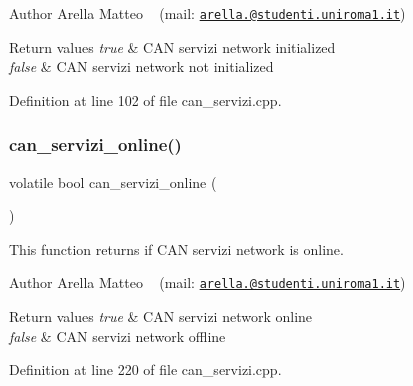 \begin{DoxyAuthor}{Author}
Arella Matteo ~\newline
 (mail\+: \href{mailto:arella.1646983@studenti.uniroma1.it}{\tt arella.@studenti.\+uniroma1.\+it})
\end{DoxyAuthor}

\begin{DoxyRetVals}{Return values}
{\em true} & C\+AN servizi network initialized \\
\hline
{\em false} & C\+AN servizi network not initialized \\
\hline
\end{DoxyRetVals}


Definition at line 102 of file can\+\_\+servizi.\+cpp.

\mbox{\label{group___c_a_n__servizi__group_ga43e9ef52770f760c5751d83b138c7e6b}} 
\subsubsection{\texorpdfstring{can\+\_\+servizi\+\_\+online()}{can\_servizi\_online()}}
{\footnotesize\ttfamily volatile bool can\+\_\+servizi\+\_\+online (\begin{DoxyParamCaption}{ }\end{DoxyParamCaption})}



This function returns if C\+AN servizi network is online. 

\begin{DoxyAuthor}{Author}
Arella Matteo ~\newline
 (mail\+: \href{mailto:arella.1646983@studenti.uniroma1.it}{\tt arella.@studenti.\+uniroma1.\+it})
\end{DoxyAuthor}

\begin{DoxyRetVals}{Return values}
{\em true} & C\+AN servizi network online \\
\hline
{\em false} & C\+AN servizi network offline \\
\hline
\end{DoxyRetVals}


Definition at line 220 of file can\+\_\+servizi.\+cpp.

